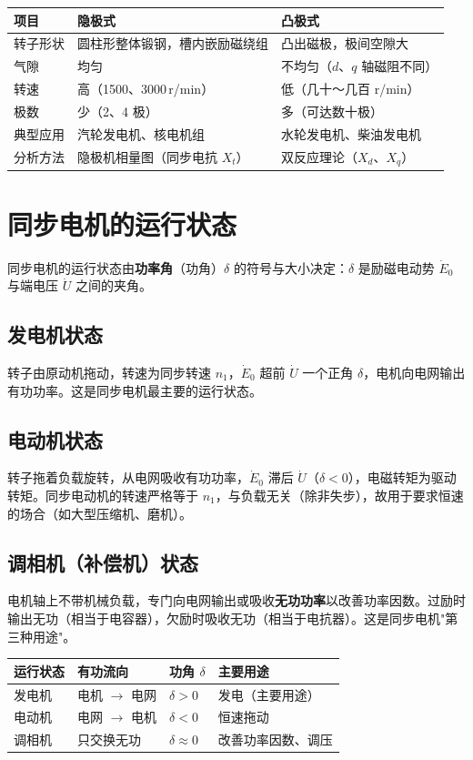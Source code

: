 \begin{center}
\begin{tabular}{@{}p{2.2cm}p{4.2cm}p{4.2cm}@{}}
\toprule
项目 & 隐极式 & 凸极式 \\
\midrule
转子形状 & 圆柱形整体锻钢，槽内嵌励磁绕组 & 凸出磁极，极间空隙大 \\
气隙 & 均匀 & 不均匀（$d$、$q$ 轴磁阻不同） \\
转速 & 高（1500、3000\,r/min） & 低（几十～几百 r/min） \\
极数 & 少（2、4 极） & 多（可达数十极） \\
典型应用 & 汽轮发电机、核电机组 & 水轮发电机、柴油发电机 \\
分析方法 & 隐极机相量图（同步电抗 $X_t$） & 双反应理论（$X_d$、$X_q$） \\
\bottomrule
\end{tabular}
\end{center}

\section{同步电机的运行状态}

同步电机的运行状态由\textbf{功率角}（功角）$\delta$ 的符号与大小决定：$\delta$ 是励磁电动势 $\dot E_0$ 与端电压 $\dot U$ 之间的夹角。

\subsection{发电机状态}
转子由原动机拖动，转速为同步转速 $n_1$，$\dot E_0$ 超前 $\dot U$ 一个正角 $\delta$，电机向电网输出有功功率。这是同步电机最主要的运行状态。

\subsection{电动机状态}
转子拖着负载旋转，从电网吸收有功功率，$\dot E_0$ 滞后 $\dot U$（$\delta<0$），电磁转矩为驱动转矩。同步电动机的转速严格等于 $n_1$，与负载无关（除非失步），故用于要求恒速的场合（如大型压缩机、磨机）。

\subsection{调相机（补偿机）状态}
电机轴上不带机械负载，专门向电网输出或吸收\textbf{无功功率}以改善功率因数。过励时输出无功（相当于电容器），欠励时吸收无功（相当于电抗器）。这是同步电机"第三种用途"。

\begin{center}
\begin{tabular}{@{}llll@{}}
\toprule
运行状态 & 有功流向 & 功角 $\delta$ & 主要用途 \\
\midrule
发电机 & 电机 $\rightarrow$ 电网 & $\delta>0$ & 发电（主要用途） \\
电动机 & 电网 $\rightarrow$ 电机 & $\delta<0$ & 恒速拖动 \\
调相机 & 只交换无功 & $\delta\approx0$ & 改善功率因数、调压 \\
\bottomrule
\end{tabular}
\end{center}

